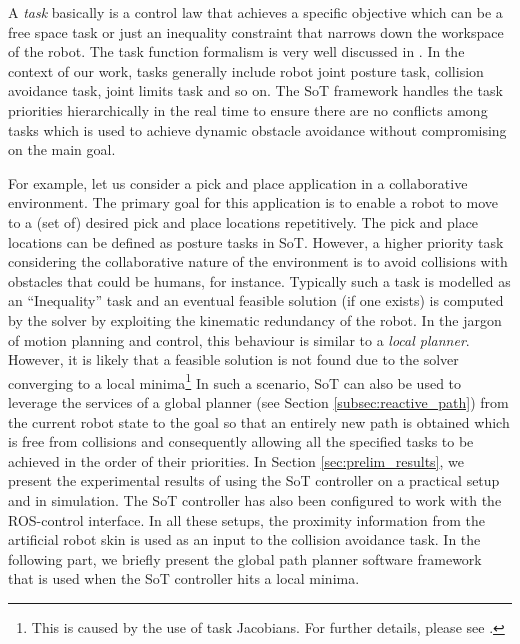A \emph{task} basically is a control law that achieves a specific objective which can be a free space task or just an inequality constraint that narrows down the workspace of the robot. The task function formalism is very well discussed in \cite{C.Samson1991}. In the context of our work, tasks generally include robot joint posture task, collision avoidance task, joint limits task and so on. The SoT framework handles the task priorities hierarchically in the real time to ensure there are no conflicts among tasks which is used to achieve dynamic obstacle avoidance without compromising on the main goal.

For example, let us consider a pick and place application in a collaborative
environment. The primary goal for this application is to enable a robot to move
to a (set of) desired pick and place locations repetitively. The pick and place
locations can be defined as posture tasks in SoT. However, a higher priority
task considering the collaborative nature of the environment is to avoid
collisions with obstacles that could be humans, for instance. Typically such a
task is modelled as an ``Inequality'' task and an eventual feasible solution (if
one exists) is computed by the solver by exploiting the kinematic redundancy of the robot. In the jargon of motion planning and control, this behaviour is similar to a \emph{local planner}.
However, it is likely that a feasible solution is not found due to the solver
converging to a local minima\footnote{This is caused by the use of task
Jacobians. For further details, please see \cite{Mansard2009}.} In such a
scenario, SoT can also be used to leverage the services of a global planner (see
Section \ref{subsec:reactive_path}) from the current robot state to the goal so
that an entirely new path is obtained which is free from collisions and
consequently allowing all the specified tasks to be achieved in the order of
their priorities. In Section \ref{sec:prelim_results}, we present the
experimental results of using the SoT controller on a practical setup and in
simulation. The SoT controller has also been configured to work with the ROS-control interface. In all these setups, the proximity information from
the artificial robot skin is used as an input to the collision avoidance task. In
the following part, we briefly present the global path planner software framework
that is used when the SoT controller hits a local minima.



